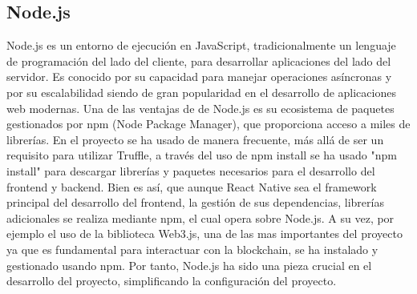 \subsection{Node.js}

Node.js es un entorno de ejecución en JavaScript, tradicionalmente un lenguaje de programación del lado del cliente, para desarrollar aplicaciones del lado del servidor. Es conocido por su capacidad para manejar operaciones asíncronas y por su escalabilidad siendo de gran popularidad en el desarrollo de aplicaciones web modernas. Una de las ventajas de de Node.js es su ecosistema de paquetes gestionados por npm (Node Package Manager), que proporciona acceso a miles de librerías.
En el proyecto se ha usado de manera frecuente, más allá de ser un requisito para utilizar Truffle, a través del uso de npm install se ha usado "npm install" para descargar librerías y paquetes necesarios para el desarrollo del frontend y backend.
Bien es así, que aunque React Native sea el framework principal del desarrollo del frontend, la gestión de sus dependencias, librerías adicionales se realiza mediante npm, el cual opera sobre Node.js.
A su vez, por ejemplo el uso de la biblioteca Web3.js, una de las mas importantes del proyecto ya que es fundamental para interactuar con la blockchain, se ha instalado y gestionado usando npm.
Por tanto, Node.js ha sido una pieza crucial en el desarrollo del proyecto, simplificando la configuración del proyecto.


